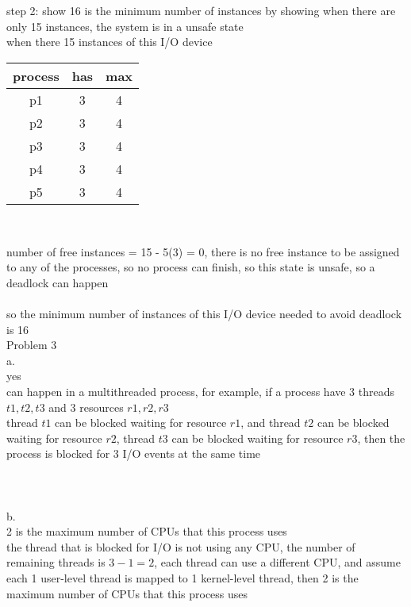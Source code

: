 \documentclass[12pt, border = 4pt, multi]{article} %
\begin{document}
\\
\\
step 2: show 16 is the minimum number of instances by showing when there are only 15 instances, the system is in a unsafe state\\
when there 15 instances of this I/O device\\
\begin{center}
\begin{tabular}{|c|c|c|}\hline
process & has & max\\\hline
p1 & 3 & 4\\\hline 
p2 & 3 & 4\\\hline  
p3 & 3 & 4\\\hline
p4 & 3 & 4\\\hline  
p5 & 3 & 4\\\hline
\end{tabular}\\
\end{center}
number of free instances = 15 - 5(3) = 0, there is no free instance to be assigned to any of the processes, so no process can finish, so this state is unsafe, so a deadlock can happen\\
\\
so the minimum number of instances of this I/O device needed to avoid deadlock is 16\\
\newpage
\noindent
Problem 3\\
a.\\
yes\\
can happen in a multithreaded process, for example, if a process have 3 threads $t1, t2, t3$ and 3 resources $r1, r2, r3$\\
thread $t1$ can be blocked waiting for resource $r1$, and thread $t2$ can be blocked waiting for resource $r2$, thread $t3$ can be blocked waiting for resource $r3$, then the process is blocked for 3 I/O events at the same time\\
\\
\\
\\
b.\\
2 is the maximum number of CPUs that this process uses\\
the thread that is blocked for I/O is not using any CPU, the number of remaining threads is $3 - 1 = 2$, each thread can use a different CPU, and assume each 1 user-level thread is mapped to 1 kernel-level thread, then 2 is the maximum number of CPUs that this process uses\\
\\
\end{document}
